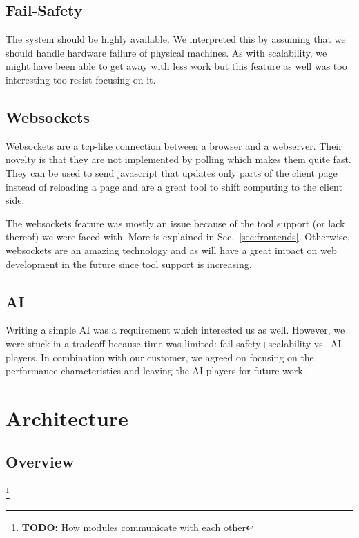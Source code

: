\documentclass[11pt,a4paper]{report}
\newcommand{\todo}[1]{\footnote{{\color{red} {\bf TODO:} #1}}}
\begin{document}
\subsection{Fail-Safety}
The system should be highly available. We interpreted this by assuming that we
should handle hardware failure of physical machines. As with scalability, we
might have been able to get away with less work but this feature as well was
too interesting too resist focusing on it.

\subsection{Websockets}
Websockets are a tcp-like connection between a browser and a webserver.
Their novelty is that they are not implemented by polling which makes them quite
fast.
They can be used to send javascript that updates only parts of the client page
instead of reloading a page and are a great tool to shift computing to the
client side.

The websockets feature was mostly an issue because of the tool support (or lack
thereof) we were faced with. More is explained in Sec.~\ref{sec:frontends}.
Otherwise, websockets are an amazing technology and as will have a great impact on
web development in the future since tool support is increasing.

\subsection{AI}
Writing a simple AI was a requirement which interested us as well. However, we
were stuck in a tradeoff because time was limited: fail-safety+scalability
vs.\ AI players. In combination with our customer, we agreed on focusing on the
performance characteristics and leaving the AI players for future work.

\section{Architecture}
\subsection{Overview}
\todo{How modules communicate with each other}
\end{document}
